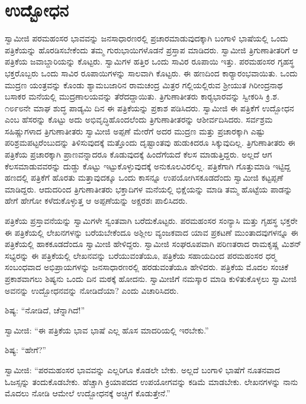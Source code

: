 
\chapter{ಉದ್ಬೋಧನ }

 ಸ್ವಾಮೀಜಿ ಪರಮಹಂಸರ ಭಾವವನ್ನು ಜನಸಾಧಾರಣರಲ್ಲಿ ಪ್ರಚಾರಮಾಡುವುದಕ್ಕಾಗಿ ಬಂಗಾಳಿ ಭಾಷೆಯಲ್ಲಿ ಒಂದು ಪತ್ರಿಕೆಯನ್ನು ಹೊರಡಿಸಬೇಕೆಂದು ತಮ್ಮ ಗುರುಭಾಯಿಗಳೊಡನೆ ಪ್ರಸ್ತಾಪ ಮಾಡಿದರು. ಸ್ವಾಮೀಜಿ ತ್ರಿಗುಣಾತೀತರಿಗೆ ಆ ಪತ್ರಿಕೆಯ ಜವಾಬ್ದಾರಿಯನ್ನು ಕೊಟ್ಟರು. ಸ್ವಾಮಿಗಳ ಹತ್ತಿರ ಒಂದು ಸಾವಿರ ರೂಪಾಯಿ ಇತ್ತು. ಪರಮಹಂಸರ ಗೃಹಸ್ಥ ಭಕ್ತರೊಬ್ಬರು ಒಂದು ಸಾವಿರ ರೂಪಾಯಿಗಳನ್ನು ಸಾಲವಾಗಿ ಕೊಟ್ಟರು. ಈ ಹಣದಿಂದ ಕಾರ‍್ಯಾರಂಭವಾಯಿತು. ಒಂದು ಮುದ್ರಣ ಯಂತ್ರವನ್ನು ಕೊಂಡು ಶ್ಯಾಮಬಜಾರಿನ ರಾಮಚಂದ್ರ ಮಿತ್ರರ ಗಲ್ಲಿಯಲ್ಲಿರುವ ಶ‍್ರೀಯುತ ಗಿರೀಂದ್ರನಾಥ ಬಸಾಕರ ಮನೆಯಲ್ಲಿ ಮುದ್ರಣಾಲಯವನ್ನು ತೆರೆದದ್ದಾಯಿತು. ತ್ರಿಗುಣಾತೀತರು ಕಾರ‍್ಯಭಾರವನ್ನು ಸ್ವೀಕರಿಸಿ ಕ್ರಿ.ಶ. ೧೮೯೮ನೇ ಮಾಘ ಶುದ್ಧ ಪಾಡ್ಯಮಿ ದಿನ ಈ ಪತ್ರಿಕೆಯನ್ನು ಪ್ರಕಾಶ ಪಡಿಸಿದರು. ಸ್ವಾಮೀಜಿ ಈ ಪತ್ರಿಕೆಗೆ ಉದ್ಬೋಧನ ಎಂಬ ಹೆಸರನ್ನು ಕೊಟ್ಟು ಅದು ಅಭಿವೃದ್ಧಿಹೊಂದಲೆಂದು ತ್ರಿಗುಣಾತೀತರನ್ನು ಆಶೀರ್ವದಿಸಿದರು. ಸರ್ವಶ್ರಮ ಸಹಿಷ್ಣುಗಳಾದ ತ್ರಿಗುಣಾತೀತರು ಸ್ವಾಮೀಜಿ ಅಪ್ಪಣೆ ಮೇರೆಗೆ ಅದರ ಮುದ್ರಣ ಮತ್ತು ಪ್ರಚಾರಕ್ಕಾಗಿ ಎಷ್ಟು ಪರಿಶ್ರಮಪಟ್ಟರೆಂಬುದನ್ನು ತಿಳಿಸುವುದಕ್ಕೆ ಮತ್ತೊಂದು ದೃಷ್ಟಾಂತವು ಹುಡುಕಿದರೂ ಸಿಕ್ಕುವುದಿಲ್ಲ. ತ್ರಿಗುಣಾತೀತರು ಈ ಪತ್ರಿಕೆಯ ಪ್ರಚಾರಕ್ಕಾಗಿ ಪ್ರಾಣವನ್ನಾದರೂ ಕೊಡುವುದಕ್ಕೆ ಹಿಂದೆಗೆಯದೆ ಕೆಲಸ ಮಾಡುತ್ತಿದ್ದರು. ಅಲ್ಲದೆ ಆಗ ಕೆಲಸಮಾಡುವವರನ್ನು ದುಡ್ಡು ಕೊಟ್ಟು ಇಟ್ಟುಕೊಳ್ಳುವುದಕ್ಕೆ ಅನುಕೂಲವಿರಲಿಲ್ಲ. ಪತ್ರಿಕೆಗಾಗಿ ಗೊತ್ತುಮಾಡಿ ಇಟ್ಟಿದ್ದ ಹಣದಲ್ಲಿ ಪತ್ರಿಕೆಗೆ ಹೊರತು ಮತ್ತಾವುದಕ್ಕೂ ಒಂದು ಕಾಸನ್ನೂ ಉಪಯೋಗಿಸಕೂಡದೆಂದು ಸ್ವಾಮೀಜಿ ಕಟ್ಟಪ್ಪಣೆ ಮಾಡಿದ್ದರು. ಆದುದರಿಂದ ತ್ರಿಗುಣಾತೀತರು ಭಕ್ತಾದಿಗಳ ಮನೆಯಲ್ಲಿ ಭಿಕ್ಷೆಯನ್ನು ಮಾಡಿ ತಮ್ಮ ಹೊಟ್ಟೆಯ ಪಾಡನ್ನು ಹೇಗೆ ಹೇಗೋ ಕಳೆದುಕೊಳ್ಳುತ್ತ ಆ ಅಪ್ಪಣೆಯನ್ನು ಅಕ್ಷರಶಃ ಪಾಲಿಸಿದರು. 

 ಪತ್ರಿಕೆಯ ಪ್ರಸ್ತಾವನೆಯನ್ನು ಸ್ವಾಮಿಗಳೇ ಸ್ವಂತವಾಗಿ ಬರೆದುಕೊಟ್ಟರು. ಪರಮಹಂಸರ ಸಂನ್ಯಾಸಿ ಮತ್ತು ಗೃಹಸ್ಥ ಭಕ್ತರೇ ಈ ಪತ್ರಿಕೆಯಲ್ಲಿ ಲೇಖನಗಳನ್ನು ಬರೆಯಬೇಕೆಂದೂ ಅಶ್ಲೀಲ ವ್ಯಂಜಕವಾದ ಯಾವ ಪ್ರಕಟಣೆ ಮುಂತಾದವುಗಳನ್ನೂ ಈ ಪತ್ರಿಕೆಯಲ್ಲಿ ಹಾಕಕೂಡದೆಂದೂ ಸ್ವಾಮೀಜಿ ಹೇಳಿದ್ದರು. ಸ್ವಾಮೀಜಿ ಸಂಘರೂಪವಾಗಿ ಪರಿಣತರಾದ ರಾಮಕೃಷ್ಣ ಮಿಶನ್ ಸಭ್ಯರನ್ನು ಈ ಪತ್ರಿಕೆಯಲ್ಲಿ ಲೇಖನವನ್ನು ಬರೆಯುವಂತೆಯೂ, ಪತ್ರಿಕೆಯ ಸಹಾಯದಿಂದ ಪರಮಹಂಸರ ಧರ‍್ಮ ಸಂಬಂಧವಾದ ಅಭಿಪ್ರಾಯಗಳನ್ನು ಜನಸಾಧಾರಣರಲ್ಲಿ ಹರಡುವಂತೆಯೂ ಹೇಳಿದರು. ಪತ್ರಿಕೆಯ ಮೊದಲ ಸಂಚಿಕೆ ಪ್ರಕಾಶವಾಗಲು ಶಿಷ್ಯನು ಒಂದು ದಿನ ಮಠಕ್ಕೆ ಹೋದನು. ಸ್ವಾಮೀಜಿಗೆ ನಮಸ್ಕಾರ ಮಾಡಿ ಕುಳಿತುಕೊಳ್ಳಲು ಸ್ವಾಮೀಜಿ ಅವನನ್ನು ಉದ್ಬೋಧನವನ್ನು ನೋಡಿದೆಯಾ? ಎಂದು ವಿಚಾರಿಸಿದರು. 

 ಶಿಷ್ಯ: “ನೋಡಿದೆ, ಚೆನ್ನಾಗಿದೆ!” 

 ಸ್ವಾಮೀಜಿ: “ಈ‌ ಪತ್ರಿಕೆಯ ಭಾವ ಭಾಷೆ ಎಲ್ಲ ಹೊಸ ಮಾದರಿಯಲ್ಲಿ ಇರಬೇಕು.” 

 ಶಿಷ್ಯ: “ಹೇಗೆ?” 

 ಸ್ವಾಮೀಜಿ: “ಪರಮಹಂಸರ ಭಾವವನ್ನು ಎಲ್ಲರಿಗೂ ಕೊಡಲೇ ಬೇಕು. ಅಲ್ಲದೆ ಬಂಗಾಳಿ ಭಾಷೆಗೆ ನೂತನವಾದ ಓಜಸ್ಸನ್ನು ತಂದುಕೊಡಬೇಕು. ಹೆಚ್ಚಾಗಿ ಕ್ರಿಯಾಪದದ ಉಪಯೋಗವನ್ನು ಕಡಿಮೆ ಮಾಡಬೇಕು. ಲೇಖನಗಳನ್ನು ನಾನು ಮೊದಲು ನೋಡಿ ಆಮೇಲೆ ಉದ್ಬೋಧನಕ್ಕೆ ಅಚ್ಚಿಗೆ ಕೊಡುತ್ತೇನೆ.” 

